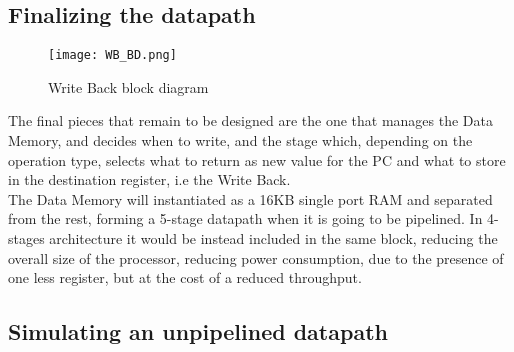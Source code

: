 \subsection{Finalizing the datapath}
\begin{figure}[ht]
    \centering
    \texttt{[image: WB\_BD.png]}
    \caption{Write Back block diagram}
    \label{fig:WB_BD}
\end{figure}

The final pieces that remain to be designed are the one that manages the Data Memory, and decides when to write, and the stage which, depending on the operation type, selects what to return as new value for the PC and what to store in the destination register, i.e the Write Back.\\
The Data Memory will instantiated as a 16KB single port RAM and separated from the rest, forming a 5-stage datapath when it is going to be pipelined. In 4-stages architecture it would be instead included in the same block, reducing the overall size of the processor, reducing power consumption, due to the presence of one less register, but at the cost of a reduced throughput. 

\subsection{Simulating an unpipelined datapath}